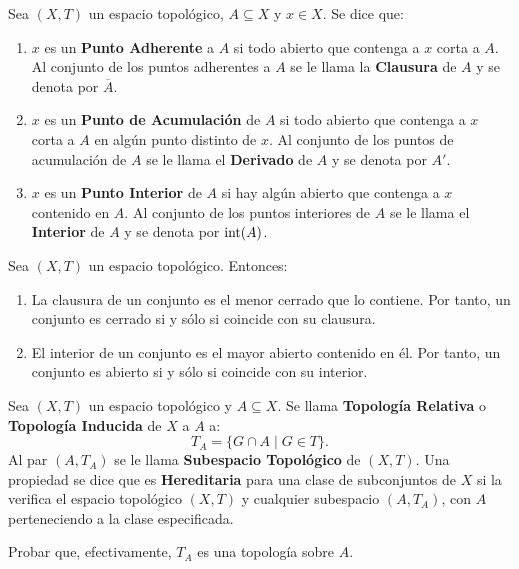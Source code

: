 \documentclass[cursovd_portada.tex]{subfiles}
\begin{document}
\begin{defi}
Sea $(X,T)$ un espacio topológico, $A\subseteq X$ y $x\in X$. Se dice que:
\begin{enumerate}
\item $x$ es un {\bf Punto Adherente} a $A$ si todo abierto que contenga a $x$ corta a $A$. Al conjunto de los
puntos adherentes a $A$ se le llama la {\bf Clausura} de $A$ y se denota por $\overline{A}$.
\item $x$ es un {\bf Punto de Acumulación} de $A$ si todo abierto que contenga a $x$ corta a $A$ en algún punto distinto
de $x$. Al conjunto de los puntos de acumulación de $A$ se le llama el {\bf Derivado} de $A$ y se denota por $A'$.
\item $x$ es un {\bf Punto Interior} de $A$ si hay algún abierto que contenga a $x$ contenido en $A$. Al conjunto de los
puntos interiores de $A$ se le llama el {\bf Interior} de $A$ y se denota por ${\rm int}(A)$.
\end{enumerate}
\end{defi}

\newpage

\begin{prop}
Sea $(X,T)$ un espacio topológico. Entonces:
\begin{enumerate}
\item La clausura de un conjunto es el menor cerrado que lo contiene. Por tanto, un conjunto es cerrado si y sólo
si coincide con su clausura.
\item El interior de un conjunto es el mayor abierto contenido en él. Por tanto, un conjunto es abierto si y sólo
si coincide con su interior.
\end{enumerate}
\end{prop}
\begin{defi}
Sea $(X,T)$ un espacio topológico y $A\subseteq X$. Se llama {\bf To\-po\-lo\-gía Relativa} o {\bf Topología
Inducida} de $X$ a $A$ a:
$$T_A=\{G\cap A\mid G\in T\}.$$
\hs Al par $(A,T_A)$ se le llama {\bf Subespacio Topológico} de $(X,T)$. Una propiedad se dice que es {\bf
Hereditaria} para una clase de subconjuntos de $X$ si la verifica el espacio topológico $(X,T)$ y cualquier
subespacio $(A,T_A)$, con $A$ perteneciendo a la clase especificada.
\end{defi}
\begin{ejer}
{\rm Probar que, efectivamente, $T_A$ es una topología sobre $A$.}
\end{ejer}
\end{document}
